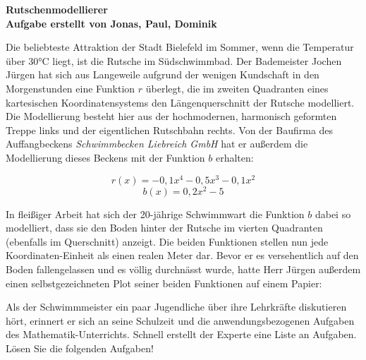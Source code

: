 \documentclass[ngerman, a4paper, 12pt]{article}
\begin{document}
\begin{center}
    \huge \bf{Rutschenmodellierer}\\
    \footnotesize{Aufgabe erstellt von Jonas, Paul, Dominik}
\end{center}

\vspace{1.5cm}

Die beliebteste Attraktion der Stadt Bielefeld im Sommer,
wenn die Temperatur über 30°C liegt,
ist die Rutsche im Südschwimmbad.
Der Bademeister Jochen Jürgen hat sich aus Langeweile
aufgrund der wenigen Kundschaft in den Morgenstunden eine Funktion $r$ überlegt,
die im zweiten Quadranten eines kartesischen Koordinatensystems den Längenquerschnitt der Rutsche modelliert.
Die Modellierung besteht hier aus der hochmodernen, harmonisch geformten Treppe links
und der eigentlichen Rutschbahn rechts.
Von der Baufirma des Auffangbeckens \textit{Schwimmbecken Liebreich GmbH}
hat er außerdem die Modellierung dieses Beckens mit der Funktion $b$ erhalten:

$$r(x) = -0,1x^4 - 0,5x^3 - 0,1x^2$$
$$b(x) = 0,2x^2 - 5$$

In fleißiger Arbeit hat sich der 20-jährige Schwimmwart die Funktion $b$ dabei so modelliert,
dass sie den Boden hinter der Rutsche im vierten Quadranten (ebenfalls im Querschnitt) anzeigt.
Die beiden Funktionen stellen nun jede Koordinaten-Einheit als einen realen Meter dar.
Bevor er es versehentlich auf den Boden fallengelassen und es völlig durchnässt wurde,
hatte Herr Jürgen außerdem einen selbstgezeichneten Plot seiner beiden Funktionen auf einem Papier:

\begin{figure}[h]
    \centering
\end{figure}

Als der Schwimmmeister ein paar Jugendliche über ihre Lehrkräfte diskutieren hört,
erinnert er sich an seine Schulzeit und die anwendungsbezogenen Aufgaben des Mathematik-Unterrichts.
Schnell erstellt der Experte eine Liste an Aufgaben. Lösen Sie die folgenden Aufgaben!
\end{document}
